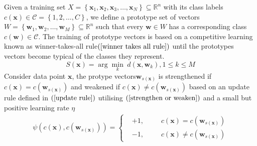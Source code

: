 Given a training set\hspace{2pt} $X=\left\lbrace \mathbf{x}_1,\mathbf{x}_2,\mathbf{x}_3,\ldots,\mathbf{x}_N\right\rbrace \subseteq \mathbb{R}^n$\hspace{2pt} with its class labels\hspace{2pt} $c\left( \mathbf{x}\right)\in\mathcal{C}=\left\lbrace 1,2,\ldots, C\right\rbrace $,\hspace{2pt} we define a prototype set of vectors\hspace{2pt} $W=\left\lbrace \mathbf{w}_1,\mathbf{w}_2,\ldots,\mathbf{w}_M\right\rbrace\subseteq \mathbb{R}^n $\hspace{2pt} such that every\hspace{2pt} $\mathbf{w}\in W$\hspace{2pt} has a corresponding class\hspace{2pt} $c\left( \mathbf{w}\right)\in\mathcal{C} $.\hspace{2pt} The  training of prototype vectors is based on a competitive learning known as winner-takes-all rule$\left( \ref{winner takes all rule}\right)$  until the prototypes vectors become typical of the classes they represent.
\begin{equation}\label{winner takes all rule}
	S\left( \mathbf{x}\right) =\arg\min_k\hspace{3pt} d\left( \mathbf{x},\mathbf{w}_k\right) ,   1\leq k \leq M
\end{equation}
Consider data point\hspace{2pt} $\mathbf{x}$, the protype vectors\hspace{4pt}$\mathbf{w}_{ s\left( \mathbf{x}\right) }$\hspace{2pt} is strengthened if\hspace{2pt} $c\left( \mathbf{x}\right) = c\left( \mathbf{w}_{ s\left( \mathbf{x}\right) }\right) $\hspace{2pt} and weakened if \hspace{2pt}$c\left( \mathbf{x}\right) \neq c\left( \mathbf{w}_{ s\left( \mathbf{x}\right) }\right) $ \hspace{2pt}based on an update rule defined in $\left( \ref{update rule}\right)$ utilising $\left( \ref{strengthen or weaken}\right)$   and  a small but positive learning rate \hspace{2pt}$\eta$
\begin{align}\label{strengthen or weaken}
	\psi \left( c\left( \mathbf{x}\right) , c\left( \mathbf{w}_{ s\left( \mathbf{x} \right) }\right)\right) = 
	\left \{
	\begin{aligned}
		&+1, &&  \hspace{10pt}c\left( \mathbf{x}\right) = c\left( \mathbf{w}_{ s\left( \mathbf{x}\right) }\right) \\
		&-1, &&  \hspace{10pt} c\left( \mathbf{x}\right) \neq c\left( \mathbf{w}_{ s\left( \mathbf{x}\right) }\right)
	\end{aligned} \right.
\end{align}
